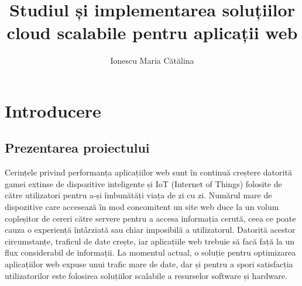 \documentclass[12pt, a4paper, oneside, romanian]{teza-upb}
\begin{document}
	
	\author{Ionescu Maria Cătălina}
	
	\title{Studiul și implementarea soluțiilor cloud scalabile pentru aplicații web}
	
	
	
	
	\beforepreface
	\listoffigures
	\listoftables
	
	
	\afterpreface 
	\chapter{Introducere}
	\section{Prezentarea proiectului}
	
	Cerințele privind performanța aplicațiilor web sunt în continuă creștere datorită gamei extinse de dispozitive inteligente și IoT (Internet of Things) folosite de către utilizatori pentru a-și îmbunătăți viața de zi cu zi. Numărul mare de dispozitive care accesează în mod concomitent un site web duce la un volum copleșitor de cereri către servere pentru a accesa informația cerută, ceea ce poate cauza o experiență întârziată sau chiar imposibilă a utilizatorul. Datorită acestor circumstanțe, traficul de date crește, iar aplicațiile web trebuie să facă față la un flux considerabil de informații. La momentul actual, o soluție pentru optimizarea aplicațiilor web expuse unui trafic mare de date, dar și pentru a spori satisfacția utilizatorilor este folosirea soluțiilor scalabile a resurselor software și hardware. 
	
\end{document}
